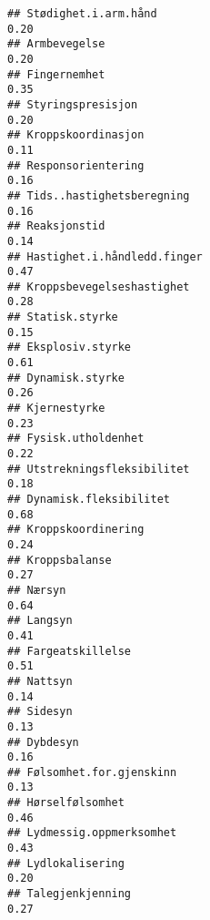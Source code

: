 \documentclass[
]{article}
\begin{document}
\begin{verbatim}
## Stødighet.i.arm.hånd                                                             0.20
## Armbevegelse                                                                     0.20
## Fingernemhet                                                                     0.35
## Styringspresisjon                                                                0.20
## Kroppskoordinasjon                                                               0.11
## Responsorientering                                                               0.16
## Tids..hastighetsberegning                                                        0.16
## Reaksjonstid                                                                     0.14
## Hastighet.i.håndledd.finger                                                      0.47
## Kroppsbevegelseshastighet                                                        0.28
## Statisk.styrke                                                                   0.15
## Eksplosiv.styrke                                                                 0.61
## Dynamisk.styrke                                                                  0.26
## Kjernestyrke                                                                     0.23
## Fysisk.utholdenhet                                                               0.22
## Utstrekningsfleksibilitet                                                        0.18
## Dynamisk.fleksibilitet                                                           0.68
## Kroppskoordinering                                                               0.24
## Kroppsbalanse                                                                    0.27
## Nærsyn                                                                           0.64
## Langsyn                                                                          0.41
## Fargeatskillelse                                                                 0.51
## Nattsyn                                                                          0.14
## Sidesyn                                                                          0.13
## Dybdesyn                                                                         0.16
## Følsomhet.for.gjenskinn                                                          0.13
## Hørselfølsomhet                                                                  0.46
## Lydmessig.oppmerksomhet                                                          0.43
## Lydlokalisering                                                                  0.20
## Talegjenkjenning                                                                 0.27

\end{verbatim}
\end{document}

